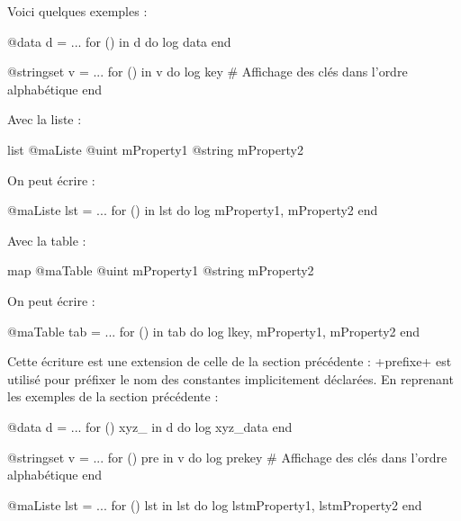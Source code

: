 Voici quelques exemples :
\begin{galgas}
@data d = ...
for () in d do
  log data
end
\end{galgas}



\begin{galgas}
@stringset v = ...
for () in v do
  log key # Affichage des clés dans l'ordre alphabétique
end
\end{galgas}

Avec la liste :
\begin{galgas}
list @maListe {
  @uint mProperty1
  @string mProperty2
}
\end{galgas}

On peut écrire :

\begin{galgas}
@maListe lst = ...
for () in lst do
  log mProperty1, mProperty2
end
\end{galgas}


Avec la table :
\begin{galgas}
map @maTable {
  @uint mProperty1
  @string mProperty2
}
\end{galgas}

On peut écrire :

\begin{galgas}
@maTable tab = ...
for () in tab do
  log lkey, mProperty1, mProperty2
end
\end{galgas}



Cette écriture est une extension de celle de la section précédente : \ggs+prefixe+ est utilisé pour préfixer le nom des constantes implicitement déclarées. En reprenant les exemples de la section précédente :

\begin{galgas}
@data d = ...
for () xyz_ in d do
  log xyz_data
end
\end{galgas}



\begin{galgas}
@stringset v = ...
for () pre in v do
  log prekey # Affichage des clés dans l'ordre alphabétique
end
\end{galgas}


\begin{galgas}
@maListe lst = ...
for () lst in lst do
  log lstmProperty1, lstmProperty2
end
\end{galgas}



